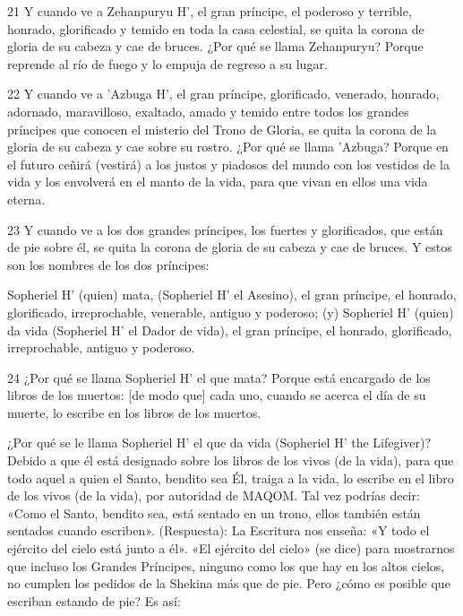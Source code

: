 \par 21 Y cuando ve a Zehanpuryu H', el gran príncipe, el poderoso y terrible, honrado, glorificado y temido en toda la casa celestial, se quita la corona de gloria de su cabeza y cae de bruces. ¿Por qué se llama Zehanpuryu? Porque reprende al río de fuego y lo empuja de regreso a su lugar.

\par 22 Y cuando ve a 'Azbuga H', el gran príncipe, glorificado, venerado, honrado, adornado, maravilloso, exaltado, amado y temido entre todos los grandes príncipes que conocen el misterio del Trono de Gloria, se quita la corona de la gloria de su cabeza y cae sobre su rostro. ¿Por qué se llama 'Azbuga? Porque en el futuro ceñirá (vestirá) a los justos y piadosos del mundo con los vestidos de la vida y los envolverá en el manto de la vida, para que vivan en ellos una vida eterna.

\par 23 Y cuando ve a los dos grandes príncipes, los fuertes y glorificados, que están de pie sobre él, se quita la corona de gloria de su cabeza y cae de bruces. Y estos son los nombres de los dos príncipes:

\par Sopheriel H' (quien) mata, (Sopheriel H' el Asesino), el gran príncipe, el honrado, glorificado, irreprochable, venerable, antiguo y poderoso; (y) Sopheriel H' (quien) da vida (Sopheriel H' el Dador de vida), el gran príncipe, el honrado, glorificado, irreprochable, antiguo y poderoso.

\par 24 ¿Por qué se llama Sopheriel H' el que mata? Porque está encargado de los libros de los muertos: [de modo que] cada uno, cuando se acerca el día de su muerte, lo escribe en los libros de los muertos.

\par ¿Por qué se le llama Sopheriel H' el que da vida (Sopheriel H' the Lifegiver)? Debido a que él está designado sobre los libros de los vivos (de la vida), para que todo aquel a quien el Santo, bendito sea Él, traiga a la vida, lo escribe en el libro de los vivos (de la vida), por autoridad de MAQOM. Tal vez podrías decir: «Como el Santo, bendito sea, está sentado en un trono, ellos también están sentados cuando escriben». (Respuesta): La Escritura nos enseña: «Y todo el ejército del cielo está junto a él». «El ejército del cielo» (se dice) para mostrarnos que incluso los Grandes Príncipes, ninguno como los que hay en los altos cielos, no cumplen los pedidos de la Shekina más que de pie. Pero ¿cómo es posible que escriban estando de pie? Es así:

